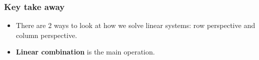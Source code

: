 \begin{frame}
  \frametitle{Key take away}
  \begin{itemize}
  \item There are 2 ways to look at how we solve linear systems: row
    perspective and column perspective.
  \item {\bf Linear combination} is the main operation.
  \end{itemize}
\end{frame}
